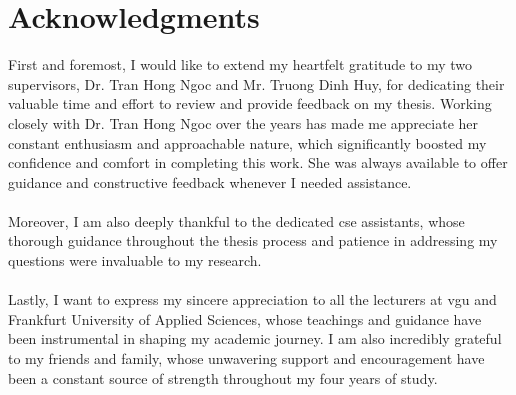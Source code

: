 \section*{Acknowledgments}




First and foremost, I would like to extend my heartfelt gratitude to my two supervisors, Dr. Tran Hong Ngoc and Mr. Truong Dinh Huy, for dedicating their valuable time and effort to review and provide feedback on my thesis. Working closely with Dr. Tran Hong Ngoc over the years has made me appreciate her constant enthusiasm and approachable nature, which significantly boosted my confidence and comfort in completing this work. She was always available to offer guidance and constructive feedback whenever I needed assistance. \\ \\
Moreover, I am also deeply thankful to the dedicated \ac{cse} assistants, whose thorough guidance throughout the thesis process and patience in addressing my questions were invaluable to my research. \\ \\
Lastly, I want to express my sincere appreciation to all the lecturers at \ac{vgu} and Frankfurt University of Applied Sciences, whose teachings and guidance have been instrumental in shaping my academic journey. I am also incredibly grateful to my friends and family, whose unwavering support and encouragement have been a constant source of strength throughout my four years of study. \\ \\